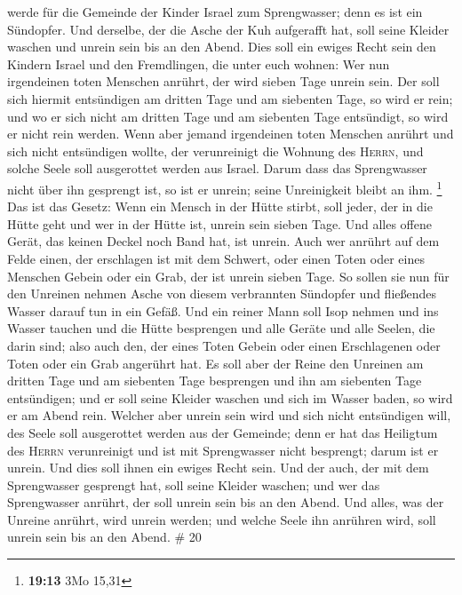 werde für die Gemeinde der Kinder Israel zum Sprengwasser; denn es ist
ein Sündopfer.  Und derselbe, der die Asche der Kuh
aufgerafft hat, soll seine Kleider waschen und unrein sein bis an den
Abend. Dies soll ein ewiges Recht sein den Kindern Israel und den
Fremdlingen, die unter euch wohnen:  Wer nun irgendeinen
toten Menschen anrührt, der wird sieben Tage unrein sein.
 Der soll sich hiermit entsündigen am dritten Tage und am
siebenten Tage, so wird er rein; und wo er sich nicht am dritten Tage
und am siebenten Tage entsündigt, so wird er nicht rein werden.
 Wenn aber jemand irgendeinen toten Menschen anrührt und
sich nicht entsündigen wollte, der verunreinigt die Wohnung des
\textsc{Herrn}, und solche Seele soll ausgerottet werden aus Israel.
Darum dass das Sprengwasser nicht über ihn gesprengt ist, so ist er
unrein; seine Unreinigkeit bleibt an ihm. \footnote{\textbf{19:13} 3Mo
  15,31}  Das ist das Gesetz: Wenn ein Mensch in der
Hütte stirbt, soll jeder, der in die Hütte geht und wer in der Hütte
ist, unrein sein sieben Tage.  Und alles offene Gerät,
das keinen Deckel noch Band hat, ist unrein.  Auch wer
anrührt auf dem Felde einen, der erschlagen ist mit dem Schwert, oder
einen Toten oder eines Menschen Gebein oder ein Grab, der ist unrein
sieben Tage.  So sollen sie nun für den Unreinen nehmen
Asche von diesem verbrannten Sündopfer und fließendes Wasser darauf tun
in ein Gefäß.  Und ein reiner Mann soll Isop nehmen und
ins Wasser tauchen und die Hütte besprengen und alle Geräte und alle
Seelen, die darin sind; also auch den, der eines Toten Gebein oder einen
Erschlagenen oder Toten oder ein Grab angerührt hat.  Es
soll aber der Reine den Unreinen am dritten Tage und am siebenten Tage
besprengen und ihn am siebenten Tage entsündigen; und er soll seine
Kleider waschen und sich im Wasser baden, so wird er am Abend rein.
 Welcher aber unrein sein wird und sich nicht entsündigen
will, des Seele soll ausgerottet werden aus der Gemeinde; denn er hat
das Heiligtum des \textsc{Herrn} verunreinigt und ist mit Sprengwasser
nicht besprengt; darum ist er unrein.  Und dies soll
ihnen ein ewiges Recht sein. Und der auch, der mit dem Sprengwasser
gesprengt hat, soll seine Kleider waschen; und wer das Sprengwasser
anrührt, der soll unrein sein bis an den Abend.  Und
alles, was der Unreine anrührt, wird unrein werden; und welche Seele ihn
anrühren wird, soll unrein sein bis an den Abend. \# 20 

